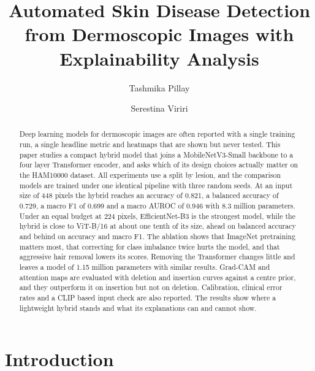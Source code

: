 \documentclass[runningheads]{llncs}
\begin{document}
\title{Automated Skin Disease Detection from Dermoscopic Images with Explainability Analysis}

\author{Tashmika Pillay \and Serestina Viriri}

\maketitle

\begin{abstract}
Deep learning models for dermoscopic images are often reported with a single training run, a single headline metric and heatmaps that are shown but never tested. This paper studies a compact hybrid model that joins a MobileNetV3-Small backbone to a four layer Transformer encoder, and asks which of its design choices actually matter on the HAM10000 dataset. All experiments use a split by lesion, and the comparison models are trained under one identical pipeline with three random seeds. At an input size of 448 pixels the hybrid reaches an accuracy of 0.821, a balanced accuracy of 0.729, a macro F1 of 0.699 and a macro AUROC of 0.946 with 8.3 million parameters. Under an equal budget at 224 pixels, EfficientNet-B3 is the strongest model, while the hybrid is close to ViT-B/16 at about one tenth of its size, ahead on balanced accuracy and behind on accuracy and macro F1. The ablation shows that ImageNet pretraining matters most, that correcting for class imbalance twice hurts the model, and that aggressive hair removal lowers its scores. Removing the Transformer changes little and leaves a model of 1.15 million parameters with similar results. Grad-CAM and attention maps are evaluated with deletion and insertion curves against a centre prior, and they outperform it on insertion but not on deletion. Calibration, clinical error rates and a CLIP based input check are also reported. The results show where a lightweight hybrid stands and what its explanations can and cannot show.

\end{abstract}

\section{Introduction}
\end{document}
